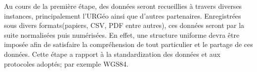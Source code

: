 \par
Au cours de la première étape, des données seront recueillies à 
travers diverses instances, principalement l'URGéo ainsi que d'autres partenaires. 
Enregistrées sous divers formats(papiers, CSV, PDF entre autres), 
ces données seront par la suite normalisées puis numérisées. En 
effet, une structure uniforme devra être imposée afin de satisfaire la 
compréhension de tout particulier et le partage de ces données.
Cette étape a rapport à la standardization des données et aux protocoles adoptés; par 
exemple WGS84.